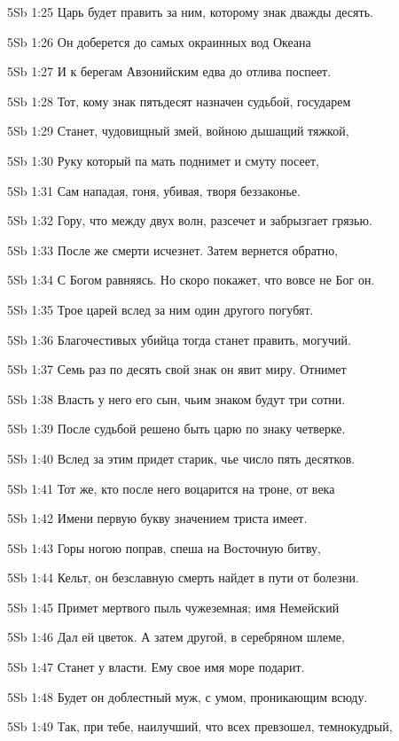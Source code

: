 \vs 5Sb 1:25 Царь будет править за ним, которому знак дважды десять. 

\vs 5Sb 1:26 Он доберется до самых окраинных вод Океана 

\vs 5Sb 1:27 И к берегам Авзонийским едва до отлива поспеет. 

\vs 5Sb 1:28 Тот, кому знак пятьдесят назначен судьбой, государем

\vs 5Sb 1:29 Станет, чудовищный змей, войною дышащий тяжкой, 

\vs 5Sb 1:30 Руку который па мать поднимет и смуту посеет,

\vs 5Sb 1:31 Сам нападая, гоня, убивая, творя беззаконье.

\vs 5Sb 1:32 Гору, что между двух волн, разсечет и забрызгает грязью.

\vs 5Sb 1:33 После же смерти исчезнет. Затем вернется обратно,

\vs 5Sb 1:34 С Богом равняясь. Но скоро покажет, что вовсе не Бог он. 

\vs 5Sb 1:35 Трое царей вслед за ним один другого погубят.

\vs 5Sb 1:36 Благочестивых убийца тогда станет править, могучий.

\vs 5Sb 1:37 Семь раз по десять  свой знак  он явит миру. Отнимет

\vs 5Sb 1:38 Власть у него его сын, чьим знаком будут три сотни.

\vs 5Sb 1:39 После судьбой решено быть царю  по знаку четверке. 

\vs 5Sb 1:40 Вслед за этим придет старик, чье число пять десятков.

\vs 5Sb 1:41 Тот же, кто после него воцарится на троне, от века

\vs 5Sb 1:42 Имени первую букву значением триста имеет.

\vs 5Sb 1:43 Горы ногою поправ, спеша на Восточную битву,

\vs 5Sb 1:44 Кельт, он безславную смерть найдет в пути от болезни. 

\vs 5Sb 1:45 Примет мертвого пыль чужеземная; имя Немейский

\vs 5Sb 1:46 Дал ей цветок. А затем  другой, в серебряном шлеме,

\vs 5Sb 1:47 Станет у власти. Ему свое имя море подарит.

\vs 5Sb 1:48 Будет он доблестный муж, с умом, проникающим всюду.

\vs 5Sb 1:49 Так, при тебе, наилучший, что всех превзошел, темнокудрый, 

